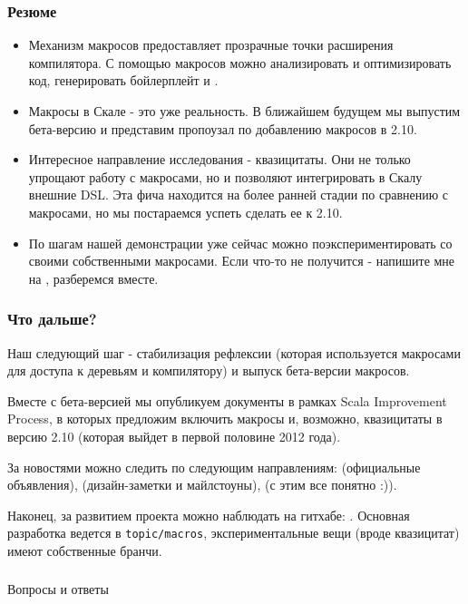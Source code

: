 \documentclass[hyperref={bookmarks=false}]{beamer}
\begin{document}
\begin{frame}[t,fragile]
\frametitle{Резюме}
\begin{itemize}
\item Механизм макросов предоставляет прозрачные точки расширения компилятора. С помощью макросов можно  анализировать и оптимизировать код, генерировать бойлерплейт и .
\item Макросы в Скале - это уже реальность. В ближайшем будущем мы выпустим бета-версию и представим пропоузал по добавлению макросов в 2.10.
\item Интересное направление исследования - квазицитаты. Они не только упрощают работу с макросами, но и позволяют интегрировать в Скалу внешние DSL. Эта фича находится на более ранней стадии по сравнению с макросами, но мы постараемся успеть сделать ее к 2.10.
\item По шагам нашей демонстрации уже сейчас можно поэкспериментировать со своими собственными макросами. Если что-то не получится - напишите мне на , разберемся вместе.
\end{itemize}
\end{frame}

\begin{frame}[t,fragile]
\frametitle{Что дальше?}

Наш следующий шаг - стабилизация рефлексии (которая используется макросами для доступа к деревьям и компилятору) и выпуск бета-версии макросов.

Вместе с бета-версией мы опубликуем документы в рамках Scala Improvement Process, в которых предложим включить макросы и, возможно, квазицитаты в версию 2.10 (которая выйдет в первой половине 2012 года).

За новостями можно следить по следующим направлениям:  (официальные объявления),  (дизайн-заметки и майлстоуны),  (с этим все понятно :)).

Наконец, за развитием проекта можно наблюдать на гитхабе: . Основная разработка ведется в \texttt{topic/macros}, экспериментальные вещи (вроде квазицитат) имеют собственные бранчи.
\end{frame}

\begin{frame}[c, fragile]
\frametitle{}

\centering
{\Large Вопросы и ответы}\\

\centering
{}

\end{frame}
\end{document}
